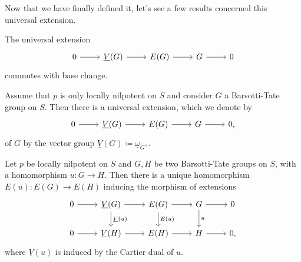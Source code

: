 \noindent
Now that we have finally defined it, let's see
a few results concerned this universal extension.


\begin{lem}
	The universal extension 
	\begin{equation*}
	\begin{tikzcd}
		0 \arrow[r, "", rightarrow] &
		\underline{V}(G) \arrow[r, "", rightarrow] &
		E(G) \arrow[r, "", rightarrow] &
		G \arrow[r, "", rightarrow] &
		0
	\end{tikzcd}
	\end{equation*}
	commutes with base change.
\end{lem} 


\begin{lem}
	Assume that $p$ is only locally nilpotent on $S$
	and consider $G$ a Barsotti-Tate group on $S$.
	Then there is a universal extension, which we denote by
	\begin{equation*}
	\begin{tikzcd}
		0 \arrow[r, "", rightarrow] &
		\underline{V}(G) \arrow[r, "", rightarrow] &
		E(G) \arrow[r, "", rightarrow] &
		G \arrow[r, "", rightarrow] &
		0
	,\end{tikzcd}
	\end{equation*}
	of $G$ by the vector group
	$\underline{V}(G) \coloneqq \underline{\omega}_{G^\vee}$.
\end{lem} 


\begin{prop}\label{prop:MorUnivExts}
	Let $p$ be locally nilpotent on $S$ and $G,H$ be two
	Barsotti-Tate groups on $S$, with a homomorphism $u\colon G \to H$.
	Then there is a unique homomorphism
	$E(u)\colon E(G) \to E(H)$ inducing the morphism of extensions
	\begin{equation*}
	\begin{tikzcd}
		0 \arrow[r, "", rightarrow] &
		\underline{V}(G) \arrow[r, "", rightarrow] 
		\arrow[d, "\underline{V}(u)", rightarrow] &
		E(G) \arrow[r, "", rightarrow] 
		\arrow[d, "E(u)", rightarrow] &
		G \arrow[r, "", rightarrow] 
		\arrow[d, "u", rightarrow] &
		0\\
		0 \arrow[r, "", rightarrow] &
		\underline{V}(H) \arrow[r, "", rightarrow] &
		E(H) \arrow[r, "", rightarrow] &
		H \arrow[r, "", rightarrow] &
		0
	,\end{tikzcd}
	\end{equation*}
	where $\underline{V}(u)$ is induced by the Cartier dual of $u$.
\end{prop} 


